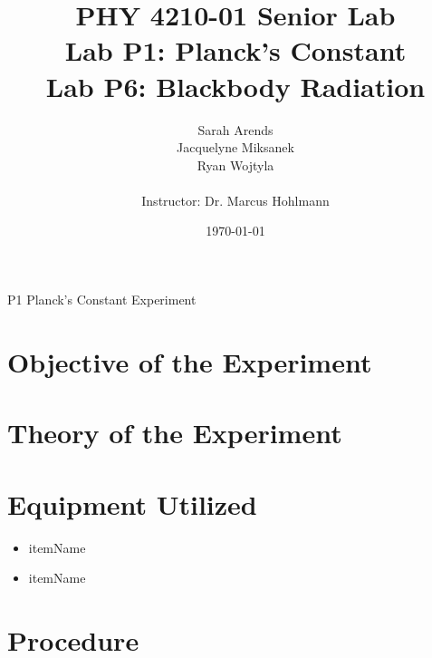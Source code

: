 \documentclass[a4paper]{article}
\title{PHY 4210-01 Senior Lab \\Lab P1: Planck's Constant\\Lab P6: Blackbody Radiation}
\author{Sarah Arends \\
        Jacquelyne Miksanek \\
        Ryan Wojtyla \\ \\
        Instructor: Dr. Marcus Hohlmann}
\date{\today}
\begin{document}
\maketitle

\begin{abstract}
\qq 
\end{abstract}

\newpage

\tableofcontents

\newpage

P1 Planck's Constant Experiment

\newpage

\section{Objective of the Experiment}
\qq 

\section{Theory of the Experiment}


\section{Equipment Utilized}

\qq 

\begin{itemize}
\item itemName \\
\item itemName \\
\end{itemize}

\begin{figure}[H]
\centering
\label{Diagram}
\end{figure}

\section{Procedure}
\end{document}
